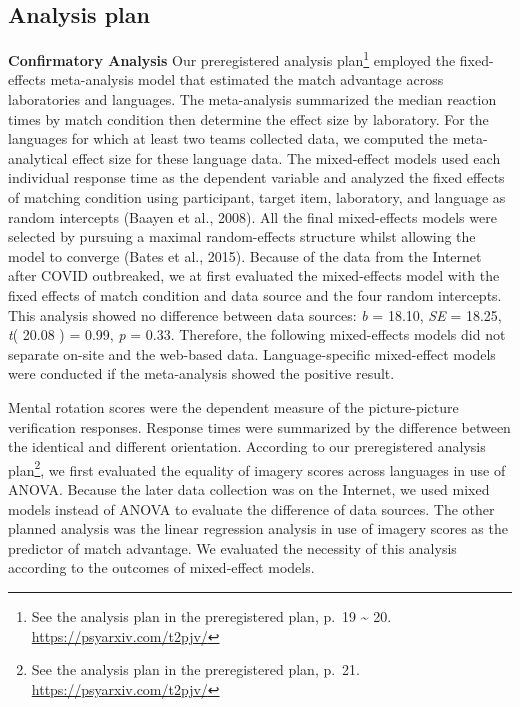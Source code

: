 \documentclass[
  man,floatsintext]{apa6}
\begin{document}
\hypertarget{analysis-plan}{%
\subsection{Analysis plan}\label{analysis-plan}}

\textbf{Confirmatory Analysis} Our preregistered analysis plan\footnote{See the analysis plan in the preregistered plan, p.~19 \textasciitilde{} 20. \url{https://psyarxiv.com/t2pjv/}} employed the fixed-effects meta-analysis model that estimated the match advantage across laboratories and languages. The meta-analysis summarized the median reaction times by match condition then determine the effect size by laboratory. For the languages for which at least two teams collected data, we computed the meta-analytical effect size for these language data.
The mixed-effect models used each individual response time as the dependent variable and analyzed the fixed effects of matching condition using participant, target item, laboratory, and language as random intercepts (Baayen et al., 2008). All the final mixed-effects models were selected by pursuing a maximal random-effects structure whilst allowing the model to converge (Bates et al., 2015). Because of the data from the Internet after COVID outbreaked, we at first evaluated the mixed-effects model with the fixed effects of match condition and data source and the four random intercepts. This analysis showed no difference between data sources: \emph{b} = 18.10, \emph{SE} = 18.25, \emph{t}( 20.08 ) = 0.99, \emph{p} = 0.33. Therefore, the following mixed-effects models did not separate on-site and the web-based data. Language-specific mixed-effect models were conducted if the meta-analysis showed the positive result.

Mental rotation scores were the dependent measure of the picture-picture verification responses. Response times were summarized by the difference between the identical and different orientation. According to our preregistered analysis plan\footnote{See the analysis plan in the preregistered plan, p.~21. \url{https://psyarxiv.com/t2pjv/}}, we first evaluated the equality of imagery scores across languages in use of ANOVA. Because the later data collection was on the Internet, we used mixed models instead of ANOVA to evaluate the difference of data sources. The other planned analysis was the linear regression analysis in use of imagery scores as the predictor of match advantage. We evaluated the necessity of this analysis according to the outcomes of mixed-effect models.
\end{document}
